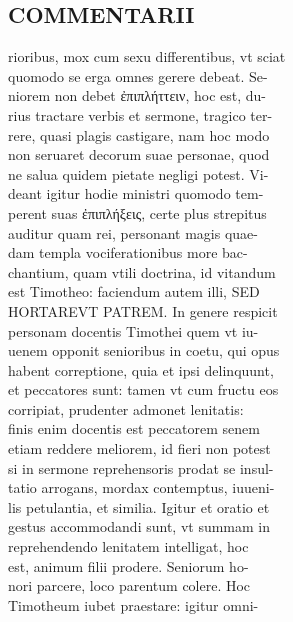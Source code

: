\documentclass{article}
\begin{document}
\begin{pages}
\section*{COMMENTARII \\
                }rioribus, mox cum sexu differentibus, vt sciat \\
                quomodo se erga omnes gerere debeat. Se- \\
                niorem non debet ἐπιπλήττειν, hoc est, du- \\
                rius tractare verbis et sermone, tragico ter- \\
                rere, quasi plagis castigare, nam hoc modo \\
                non seruaret decorum suae personae, quod \\
                ne salua quidem pietate negligi potest. Vi- \\
                deant igitur hodie ministri quomodo tem- \\
                perent suas ἐπιπλήξεις, certe plus strepitus \\
                auditur quam rei, personant magis quae- \\
                dam templa vociferationibus more bac- \\
                chantium, quam vtili doctrina, id vitandum \\
                est Timotheo: faciendum autem illi, SED \\
                HORTAREVT PATREM. In genere respicit \\
                personam docentis Timothei quem vt iu- \\
                uenem opponit senioribus in coetu, qui opus \\
                habent correptione, quia et ipsi delinquunt, \\
                et peccatores sunt: tamen vt cum fructu eos \\
                corripiat, prudenter admonet lenitatis: \\
                finis enim docentis est peccatorem senem \\
                etiam reddere meliorem, id fieri non potest \\
                si in sermone reprehensoris prodat se insul- \\
                tatio arrogans, mordax contemptus, iuueni- \\
                lis petulantia, et similia. Igitur et oratio et \\
                gestus accommodandi sunt, vt summam in \\
                reprehendendo lenitatem intelligat, hoc \\
                est, animum filii prodere. Seniorum ho- \\
                nori parcere, loco parentum colere. Hoc \\
                Timotheum iubet praestare: igitur omni- \\
                

\end{pages}
\end{document}
